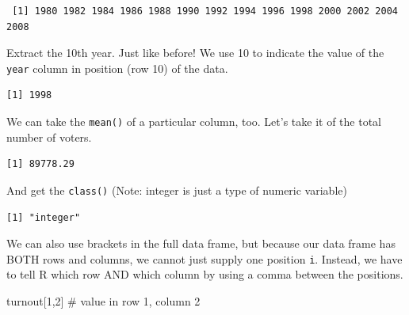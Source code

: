\documentclass[
  letterpaper,
  DIV=11,
  numbers=noendperiod]{scrreprt}
\newenvironment{Shaded}{\begin{snugshade}}{\end{snugshade}}
\newcommand{\CommentTok}[1]{\textcolor[rgb]{0.37,0.37,0.37}{#1}}
\newcommand{\DecValTok}[1]{\textcolor[rgb]{0.68,0.00,0.00}{#1}}
\newcommand{\FunctionTok}[1]{\textcolor[rgb]{0.28,0.35,0.67}{#1}}
\newcommand{\NormalTok}[1]{\textcolor[rgb]{0.00,0.23,0.31}{#1}}
\newcommand{\SpecialCharTok}[1]{\textcolor[rgb]{0.37,0.37,0.37}{#1}}
\begin{document}
\begin{verbatim}
 [1] 1980 1982 1984 1986 1988 1990 1992 1994 1996 1998 2000 2002 2004 2008
\end{verbatim}

Extract the 10th year. Just like before! We use 10 to indicate the value
of the \texttt{year} column in position (row 10) of the data.

\begin{Shaded}
\end{Shaded}

\begin{verbatim}
[1] 1998
\end{verbatim}

We can take the \texttt{mean()} of a particular column, too. Let's take
it of the total number of voters.

\begin{Shaded}
\end{Shaded}

\begin{verbatim}
[1] 89778.29
\end{verbatim}

And get the \texttt{class()} (Note: integer is just a type of numeric
variable)

\begin{Shaded}
\end{Shaded}

\begin{verbatim}
[1] "integer"
\end{verbatim}

We can also use brackets in the full data frame, but because our data
frame has BOTH rows and columns, we cannot just supply one position
\texttt{i}. Instead, we have to tell R which row AND which column by
using a comma between the positions.

\begin{Shaded}
\begin{Highlighting}[]
\NormalTok{turnout[}\DecValTok{1}\NormalTok{,}\DecValTok{2}\NormalTok{] }\CommentTok{\# value in row 1, column 2}
\end{Highlighting}
\end{Shaded}
\end{document}
